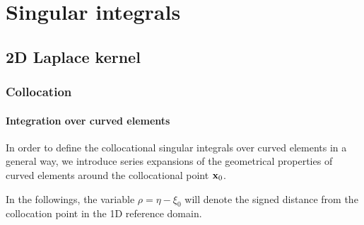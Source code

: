 \chapter{Singular integrals}

\section{2D Laplace kernel}

\subsection{Collocation}

\subsubsection{Integration over curved elements}

In order to define the collocational singular integrals over curved elements in a general way, we introduce series expansions of the geometrical properties of curved elements around the collocational point ${\bf x}_0$.

In the followings, the variable $\rho = \eta - \xi_0$ will denote the signed distance from the collocation point in the 1D reference domain.

